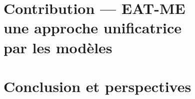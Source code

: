 \documentclass[a4paper,11pt,twoside]{book}
\begin{document}
    \part[Contribution — EAT-ME~: une approche unificatrice]%
         {Contribution — EAT-ME \\ une approche unificatrice \\par les modèles}
    
    
    
    \part{Conclusion et perspectives}
    
    
    \appendix
%    
    \printglossaries
    
    
\end{document}
